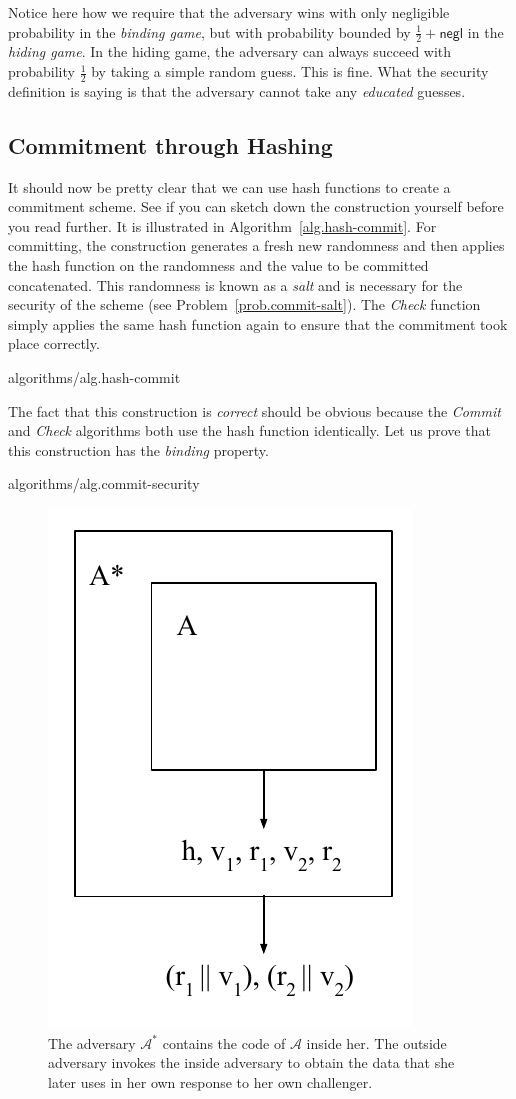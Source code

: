 Notice here how we require that the adversary wins with only negligible probability in the \emph{binding game},
but with probability bounded by $\frac{1}{2} + \textsf{negl}$ in the \emph{hiding game}. In the hiding game,
the adversary can always succeed with probability $\frac{1}{2}$ by taking a simple random guess. This is fine.
What the security definition is saying is that the adversary cannot take any \emph{educated} guesses.

\subsection*{Commitment through Hashing}

It should now be pretty clear that we can use hash functions to create a commitment scheme. See if you can
sketch down the construction yourself before you read further. It is illustrated in Algorithm~\ref{alg.hash-commit}.
For committing, the construction generates a fresh new randomness and then applies the hash function
on the randomness and the value to be committed concatenated. This randomness is known as a \emph{salt}
and is necessary for the security of the scheme (see Problem~\ref{prob.commit-salt}). The \emph{Check} function
simply applies the same hash function again to ensure that the commitment took place correctly.

{algorithms/alg.hash-commit}

The fact that this construction is \emph{correct} should be obvious because the \emph{Commit} and
\emph{Check} algorithms both use the hash function identically.
Let us prove that this construction has the \emph{binding} property.

{algorithms/alg.commit-security}

\begin{figure}[h]
    \centering
    \includegraphics[width=0.35 \columnwidth,keepaspectratio]{figures/hash-commitment-reduction.pdf}
    \caption{The adversary $\mathcal{A}^*$ contains the code of $\mathcal{A}$ inside her. The outside
             adversary invokes the inside adversary to obtain the data that she later uses in her own
             response to her own challenger.}
    \label{fig.hash-commitment-reduction}
\end{figure}

